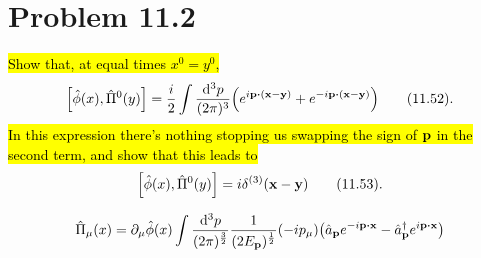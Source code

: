 \documentclass{article}
\begin{document}
\section*{Problem 11.2}
\begin{quoting}
    \hl{Show that, at equal times $x^0=y^0$,}\[\bqty{\hat{\phi}(x),\hat{\Pi}^0(y)}=\frac{i}{2}\int\frac{\dd[3]{p}}{(2\pi)^3}\pqty{e^{i\vb{p\vdot(\vb{x}-\vb{y})}}+e^{-i\vb{p\vdot(\vb{x}-\vb{y})}}}\qquad(11.52).\]\hl{In this expression there's nothing stopping us swapping the sign of $\vb{p}$ in the second term, and show that this leads to}\[\bqty{\hat{\phi}(x),\hat{\Pi}^0(y)}=i\delta^{(3)}(\vb{x}-\vb{y})\qquad(11.53).\]
\end{quoting}

\[\hat{\Pi}_\mu (x)=\partial_\mu \hat{\phi}(x)\int\frac{\dd[3]{p}}{(2\pi)^{\frac{3}{2}}}\frac{1}{(2E_{\vb{p}})^{\frac{1}{2}}}(-ip_\mu)\pqty{\hat{a}_{\vb{p}}e^{-i\vb{p}\vdot\vb{x}}-\hat{a}^\dagger_{\vb{p}}e^{i\vb{p}\vdot\vb{x}}}\]
\end{document}
